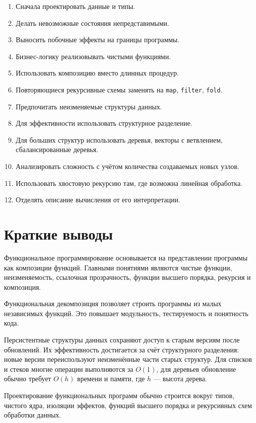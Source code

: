 \documentclass[12pt,a4paper]{article}
\begin{document}
\begin{enumerate}
  \item Сначала проектировать данные и типы.
  \item Делать невозможные состояния непредставимыми.
  \item Выносить побочные эффекты на границы программы.
  \item Бизнес-логику реализовывать чистыми функциями.
  \item Использовать композицию вместо длинных процедур.
  \item Повторяющиеся рекурсивные схемы заменять на \texttt{map}, \texttt{filter}, \texttt{fold}.
  \item Предпочитать неизменяемые структуры данных.
  \item Для эффективности использовать структурное разделение.
  \item Для больших структур использовать деревья, векторы с ветвлением, сбалансированные деревья.
  \item Анализировать сложность с учётом количества создаваемых новых узлов.
  \item Использовать хвостовую рекурсию там, где возможна линейная обработка.
  \item Отделять описание вычисления от его интерпретации.
\end{enumerate}

\section{Краткие выводы}

Функциональное программирование основывается на представлении программы как композиции функций. Главными понятиями являются чистые функции, неизменяемость, ссылочная прозрачность, функции высшего порядка, рекурсия и композиция.

Функциональная декомпозиция позволяет строить программы из малых независимых функций. Это повышает модульность, тестируемость и понятность кода.

Персистентные структуры данных сохраняют доступ к старым версиям после обновлений. Их эффективность достигается за счёт структурного разделения: новые версии переиспользуют неизменённые части старых структур. Для списков и стеков многие операции выполняются за $O(1)$, для деревьев обновление обычно требует $O(h)$ времени и памяти, где $h$ --- высота дерева.

Проектирование функциональных программ обычно строится вокруг типов, чистого ядра, изоляции эффектов, функций высшего порядка и рекурсивных схем обработки данных.
\end{document}
